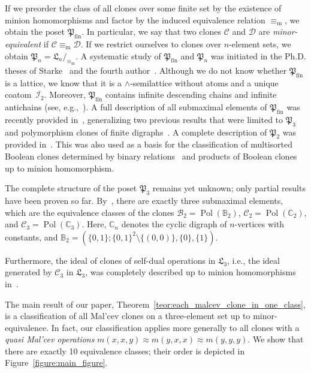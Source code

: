 \documentclass[12pt]{amsart}
\theoremstyle{definition}
\theoremstyle{definition}
\newcommand{\Pfin}{\mathfrak P_{\mathrm{fin}}}
\newcommand{\Pboole}{\mathfrak P_{2}}
\newcommand{\Pthree}{\mathfrak P_{3}}
\newcommand{\Pn}{\mathfrak P_{n}}
\newcommand{\clo}[1]{\mathcal{#1}}
\DeclareMathOperator{\Pol}{Pol}
\newcommand{\minorequivalentto}{\equiv_{\mathrm{m}}}
\begin{document}
If we preorder the class of all clones over some finite set by the existence of minion homomorphisms and factor by the induced equivalence relation $\minorequivalentto$, we obtain the poset $\Pfin$. In particular, we say that two clones $\clo{C}$ and $\clo{D}$ are \emph{minor-equivalent} if $\clo{C} \minorequivalentto \clo{D}$. If we restrict ourselves to clones over $n$-element sets, we obtain $\Pn = \mathfrak L_n/_{\minorequivalentto}$. A systematic study of $\Pfin$ and $\Pn$ was initiated in the Ph.D. theses of Starke~\cite{FlorianThesis} and the fourth author~\cite{AlbertThesis}. Although we do not know whether $\Pfin$ is a lattice, we know that it is a $\wedge$-semilattice without atoms and a unique coatom~$\overline{\clo{I}_2}$. Moreover, $\Pfin$ contains infinite descending chains and infinite antichains (see, e.g.,~\cite{cyclesBodirskyStrakeVucaj}). A full description of all submaximal elements of $\Pfin$ was recently provided in~\cite{meyerSubmaximal}, generalizing two previous results that were limited to $\Pthree$~\cite{VucajZhuk} and polymorphism clones of finite digraphs~\cite{BodirskyStarke}. A complete description of $\Pboole$ was provided in~\cite{albert}. This was also used as a basis for the classification of multisorted Boolean clones determined by binary relations~\cite{BartoKapytka} and products of Boolean clones~\cite{RadekOlsak} up to minion homomorphism.

The complete structure of the poset $\Pthree$ remains yet unknown; only partial results have been proven so far. By~\cite{VucajZhuk}, there are exactly three submaximal elements, which are the equivalence classes of the clones $\clo{B}_2 = \Pol(\mathbb B_2)$, $\clo{C}_2 = \Pol(\mathbb C_2)$, and $\clo{C}_3 = \Pol(\mathbb C_3)$. Here, $\mathbb C_n$ denotes the cyclic digraph of $n$-vertices with constants, and $\mathbb B_2 = (\{0,1\}; \{0,1\}^2\setminus \{(0,0)\}, \{0\},\{1\})$. 

Furthermore, the ideal of clones of self-dual operations in $\mathfrak L_3$, i.e., the ideal generated by $\clo{C}_3$ in $\mathfrak L_3$, was completely described up to minion homomorphisms in~\cite{BodirskyVucajZhuk}. 


The main result of our paper, Theorem~\ref{teor:each_malcev_clone_in_one_class}, is a classification of all Mal'cev clones on a three-element set up to minor-equivalence. In fact, our classification applies more generally to all clones with a \emph{quasi Mal'cev operations} $m(x,x,y)\approx m(y,x,x)\approx m(y,y,y)$. We show that there are exactly 10 equivalence classes; their order is depicted in Figure~\ref{figure:main_figure}.
\end{document}

